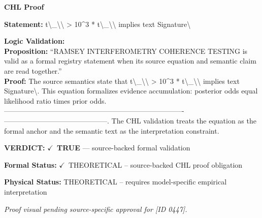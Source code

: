 \vspace{0.45em}
\noindent\textbf{CHL Proof}\par
\textbf{Statement:} t\textbackslash{}\_\textbackslash{}\textbackslash{} > 10\textasciicircum{}3 * t\textbackslash{}\_\textbackslash{}\textbackslash{} implies text Signature\textbackslash{}

\textbf{Logic Validation:}\\
\textbf{Proposition:} ``RAMSEY INTERFEROMETRY COHERENCE TESTING is valid as a formal registry statement when its
source equation and semantic claim are read together.''\\
\textbf{Proof:} The source semantics state that t\textbackslash{}\_\textbackslash{}\textbackslash{} > 10\textasciicircum{}3 * t\textbackslash{}\_\textbackslash{}\textbackslash{} implies text Signature\textbackslash{}. This
equation formalizes evidence accumulation: posterior odds equal likelihood ratio times
prior odds. ----------------------------------------------------------------------------
--------------------------------------------. The CHL validation treats the equation as
the formal anchor and the semantic text as the interpretation constraint.

\textbf{VERDICT:} \ensuremath{\checkmark}\ \textbf{TRUE} --- source-backed formal validation

\textbf{Formal Status:} \ensuremath{\checkmark}\ THEORETICAL -- source-backed CHL proof obligation

\textbf{Physical Status:} THEORETICAL -- requires model-specific empirical interpretation
\par\vspace{0.45em}
\par
\vfill
\begingroup\footnotesize\itshape
Proof visual pending source-specific approval for [ID 0447].
\par\endgroup
\vfill
\endgroup
\endgroup
